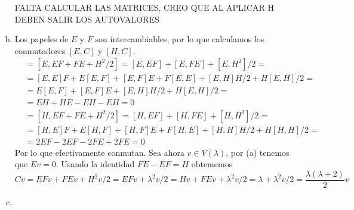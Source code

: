 \documentclass[twoside]{article}
\begin{document}
\begin{solucion}
\begin{enumerate}[(a)]
FALTA CALCULAR LAS MATRICES, CREO QUE AL APLICAR H DEBEN SALIR LOS AUTOVALORES

\item Los papeles de $E$ y $F$ son intercambiables, por lo que calculamos los conmutadores $[E,C]$ y $[H,C]$. 
\begin{align*}
[E,C]&=[E, EF + FE + H^2/2]=[E,EF]+[E,FE]+[E,H^2]/2=\\
&=[E,E]F+E[E,F]+[E,F]E+F[E,E]+[E,H]H/2+H[E,H]/2=\\
&=E[E,F]+[E,F]E+[E,H]H/2+H[E,H]/2=\\
&=EH+HE-EH-EH=0
\end{align*}
\begin{align*}
[H,C]&=[H, EF + FE + H^2/2]=[H,EF]+[H,FE]+[H,H^2]/2=\\
&=[H,E]F+E[H,F]+[H,F]E+F[H,E]+[H,H]H/2+H[H,H]/2=\\
&=2EF-2EF-2FE+2FE=0
\end{align*}
Por lo que efectivamente conmutan. Sea ahora $v\in V(\lambda)$, por (a) tenemos que $Ev=0$. Usando la identidad $FE-EF=H$ obtememos
\[
Cv=EFv+FEv+H^2v/2=EFv+\lambda^2v/2=Hv+FEv+\lambda^2v/2=\lambda+\lambda^2v/2=\frac{\lambda(\lambda+2)}{2}v
\]

\item
\end{enumerate}
\end{solucion}

\newpage
\end{document}
